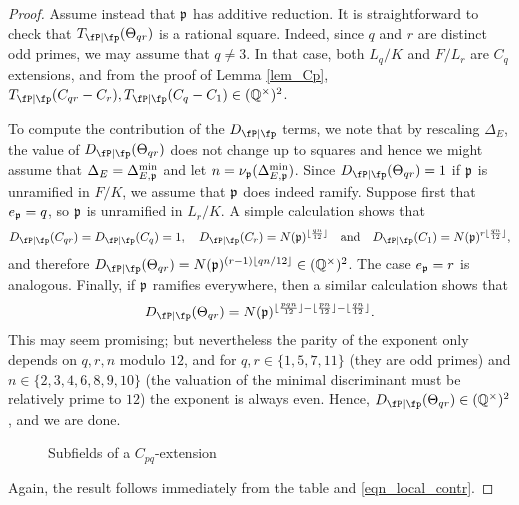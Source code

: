 \begin{proof}
    Assume instead that $\mathfrak{p}$ has additive reduction. It is straightforward to check that $\Tp(\Theta_{qr})$ is a rational square. Indeed, since $q$ and $r$ are distinct odd primes, we may assume that $q\neq 3$. In that case, both $L_q/K$ and $F/L_r$ are $C_q$ extensions, and from the proof of Lemma \ref*{lem_Cp}, $\Tp(C_{qr}-C_r),\Tp(C_{q}-C_1)\in\QQss$.
    
    To compute the contribution of the $\Dp$ terms, we note that by rescaling $\Delta_E$, the value of 
    $\Dp(\Theta_{qr})$
    does not change up to squares and hence we might assume that $\Delta_E=\Delta_{E,\mathfrak{p}}^{\min}$ and let $n=\nu_{\mathfrak{p}}(\Delta_{E,\mathfrak{p}}^{\min})$. Since $\Dp(\Theta_{qr})=1$ if $\mathfrak{p}$ is unramified in $F/K$, we assume that $\mathfrak{p}$ does indeed ramify. Suppose first that $e_{\mathfrak{p}}=q$, so $\mathfrak{p}$ is unramified in $L_r/K$. A simple calculation shows that 
    $$\Dp(C_{qr})=\Dp(C_{q})=1,\quad \Dp(C_r)=N(\pp)^{\floor{\frac{qn}{12}}}\quad\text{and}\quad \Dp(C_1)=N(\pp)^{r\floor{\frac{qn}{12}}},$$
    and therefore $\Dp(\Theta_{qr})=N(\pp)^{(r-1)\floor{qn/12}}\in\QQss$. The case $e_{\mathfrak{p}}=r$ is analogous. Finally, if $\mathfrak{p}$ ramifies everywhere, then a similar calculation shows that 
    $$\Dp(\Theta_{qr})=N(\pp)^{\floor{\frac{pqn}{12}}-\floor{\frac{pn}{12}}-\floor{\frac{qn}{12}}}.$$
    This may seem promising; but nevertheless the parity of the exponent only depends on $q,r,n$ modulo $12$, and for $q,r\in\{1,5,7,11\}$ (they are odd primes) and $n\in\{2,3,4,6,8,9,10\}$ (the valuation of the minimal discriminant must be relatively prime to $12$) the exponent is always even. Hence, $\Dp(\Theta_{qr})\in\QQss$, and we are done. 

    \begin{figure}[!ht]
        \centering
        \caption[short]{Subfields of a $C_{pq}$-extension}
    \end{figure}

    Again, the result follows immediately from the table and \eqref{eqn_local_contr}.
    
\end{proof}

